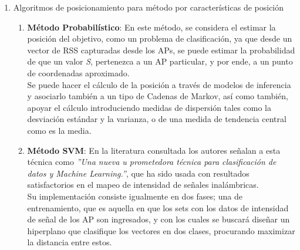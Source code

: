 \begin{itemize}
{\begin{enumerate}
        \item{Algoritmos de posicionamiento para método por características de posición}
        
            \begin{enumerate}
                \item {\textbf{Método Probabilístico}: En este método, se considera el estimar la posición del objetivo, como un problema de clasificación, ya que desde un vector de RSS capturadas desde los APs, se puede estimar la probabilidad de que un valor \textit{S}, pertenezca a un AP particular, y por ende, a un punto de coordenadas aproximado.\\
                
                Se puede hacer el cálculo de la posición a través de modelos de inferencia y asociarlo también a un tipo de Cadenas de Markov, así como también, apoyar el cálculo introduciendo medidas de dispersión tales como la desviación estándar y la varianza, o de una medida de tendencia central como es la media.
                }
                
                \clearpage 
                
                \item{\textbf{Método \ac{SVM}}: \label{SVM} En la literatura consultada \cite{7} los autores señalan a esta técnica como \textit{''Una nueva u prometedora técnica para clasificación de datos y Machine Learning.''}, que ha sido usada con resultados satisfactorios en el mapeo de intensidad de señales inalámbricas.\\
                
                Su implementación consiste igualmente en dos fases; una de entrenamiento, que es aquella en que los sets con los datos de  intensidad de señal de los AP son ingresados, y con los cuales se buscará diseñar un hiperplano que clasifique los vectores en dos clases, procurando maximizar la distancia entre estos.
                
}
\end{enumerate}
\end{enumerate}}
\end{itemize}
